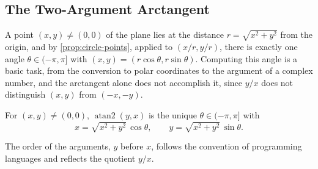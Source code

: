 \begin{table}
\end{table}

\subsection{The Two-Argument Arctangent}

A point $(x,y)\ne(0,0)$ of the plane lies at the distance $r=\sqrt{x^2+y^2}$ from the origin, and by \cref{prop:circle-points}, applied to $(x/r,y/r)$, there is exactly one angle $\theta\in(-\pi,\pi]$ with $(x,y)=(r\cos\theta,r\sin\theta)$. Computing this angle is a basic task, from the conversion to polar coordinates to the argument of a complex number, and the arctangent alone does not accomplish it, since $y/x$ does not distinguish $(x,y)$ from $(-x,-y)$.

\begin{definition}
\label{def:atan2}
For $(x,y)\ne(0,0)$, $\operatorname{atan2}(y,x)$ is the unique $\theta\in(-\pi,\pi]$ with
\[
x=\sqrt{x^2+y^2}\,\cos\theta,\qquad y=\sqrt{x^2+y^2}\,\sin\theta .
\]
\end{definition}

The order of the arguments, $y$ before $x$, follows the convention of programming languages and reflects the quotient $y/x$.

